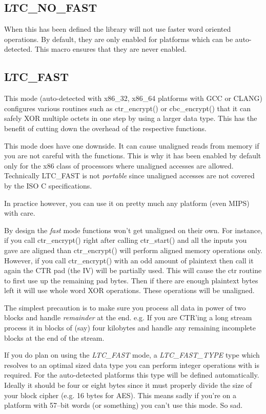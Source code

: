 \documentclass[synpaper]{book}
\begin{document}
\subsection{LTC\_NO\_FAST}
When this has been defined the library will not use faster word oriented operations.  By default, they are only enabled for platforms
which can be auto-detected.  This macro ensures that they are never enabled.

\subsection{LTC\_FAST}
This mode (auto-detected with x86\_32, x86\_64 platforms with GCC or CLANG) configures various routines such as ctr\_encrypt() or
cbc\_encrypt() that it can safely XOR multiple octets in one step by using a larger data type.  This has the benefit of
cutting down the overhead of the respective functions.

This mode does have one downside.  It can cause unaligned reads from memory if you are not careful with the functions.  This is why
it has been enabled by default only for the x86 class of processors where unaligned accesses are allowed.  Technically LTC\_FAST
is not \textit{portable} since unaligned accesses are not covered by the ISO C specifications.

In practice however, you can use it on pretty much any platform (even MIPS) with care.

By design the \textit{fast} mode functions won't get unaligned on their own.  For instance, if you call ctr\_encrypt() right after calling
ctr\_start() and all the inputs you gave are aligned than ctr\_encrypt() will perform aligned memory operations only.  However, if you
call ctr\_encrypt() with an odd amount of plaintext then call it again the CTR pad (the IV) will be partially used.  This will
cause the ctr routine to first use up the remaining pad bytes.  Then if there are enough plaintext bytes left it will use
whole word XOR operations.  These operations will be unaligned.

The simplest precaution is to make sure you process all data in power of two blocks and handle \textit{remainder} at the end.  e.g. If you are
CTR'ing a long stream process it in blocks of (say) four kilobytes and handle any remaining incomplete blocks at the end of the stream.

If you do plan on using the \textit{LTC\_FAST} mode, a \textit{LTC\_FAST\_TYPE} type which resolves to an optimal sized
data type you can perform integer operations with is required.  For the auto-detected platforms this type will be defined automatically.  Ideally it should be four or eight bytes since it must properly divide the size
of your block cipher (e.g. 16 bytes for AES).  This means sadly if you're on a platform with 57--bit words (or something) you can't
use this mode.  So sad.
\end{document}
